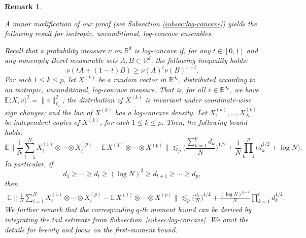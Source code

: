 \documentclass[numbers,webpdf,imaiai]{ima-authoring-template}
\theoremstyle{thmstyletwo}%
\newtheorem{remark}{Remark}%
\numberwithin{equation}{section}
\numberwithin{equation}{section}
\providecommand{\mathbbm}{\mathbb} %
\newcommand{\R}{\mathbbm{R}}
\newcommand{\E}{\mathbb{E}}
\begin{document}
\begin{remark}\label{rem:log_concave}

A minor modification of our proof (see Subsection \ref{subsec:log-concave}) yields the following result for isotropic, unconditional, log-concave ensembles. 

Recall that a probability measure $\nu$ on $\R^d$ is log-concave if, for any $t\in [0,1]$ and any nonempty Borel measurable sets $A, B\subset \R^d$, the following inequality holds:
\[
\nu(tA+(1-t)B)\ge \nu(A)^t \nu(B)^{1-t}.
\]
For each $1 \leq k \leq p$, let $X^{(k)}$ be a random vector in $\R^{d_k}$, distributed according to an isotropic, unconditional,
log-concave measure. That is, for all $v\in \R^{d_k}$, we have $\E \langle X,v \rangle^2=\|v\|_{\ell_2}^2$; the distribution of $X^{(k)}$ is invariant under coordinate-wise sign changes; and the law of $X^{(k)}$ has a log-concave density. Let $X_1^{(k)}, \ldots, X_N^{(k)}$ be independent copies of $X^{(k)}$, for each $1\le k\le p$. Then, the following bound holds:
\[
\E \bigg\|\frac{1}{N} \sum_{i=1}^N X_i^{(1)} \otimes \cdots \otimes X_i^{(p)}-\E\, X^{(1)} \otimes \cdots \otimes X^{(p)}\bigg\| \lesssim_p \bigg(\frac{\sum_{k=1}^p d_k}{N}\bigg)^{1/2}+\frac{1}{N}\prod_{k=1}^{p}\big(d_k^{1/2}+\log N\big).
\]
In particular, if
\[
d_1\ge \cdots \ge d_t \ge (\log N)^2 \ge d_{t+1} \ge \cdots \ge d_p,
\] 
then
\begin{align*}
\E \bigg\|\frac{1}{N} \sum_{i=1}^N X_i^{(1)} \otimes \cdots \otimes X_i^{(p)}-\E\, X^{(1)} \otimes \cdots \otimes X^{(p)}\bigg\| \lesssim_p  \bigg(\frac{d_1}{N}\bigg)^{1/2}+\frac{(\log N)^{p-t}}{N}\prod_{k=1}^{t}d_k^{1/2}.
\end{align*}
We further remark that the corresponding $q$-th moment bound can be derived by integrating the tail estimate from Subsection~\ref{subsec:log-concave}. We omit the details for brevity and focus on the first-moment bound. 
\end{remark}
\end{document}
